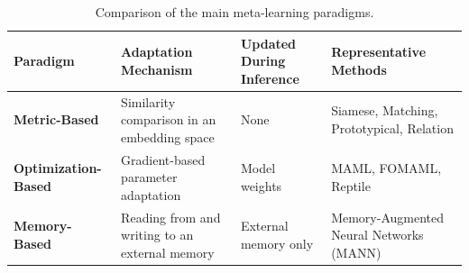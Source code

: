 \begin{table}[H]
\centering
\caption{Comparison of the main meta-learning paradigms.}
\label{tab:meta_learning_comparison}
\renewcommand{\arraystretch}{1.3}

\renewcommand{\arraystretch}{1.35}

\begin{tabularx}{\textwidth}{
>{\bfseries}p{2.8cm}
X
p{2.9cm}
X}
\toprule

Paradigm &
Adaptation Mechanism &
Updated During Inference &
Representative Methods \\

\midrule

Metric-Based &
Similarity comparison in an embedding space &
None &
Siamese, Matching, Prototypical, Relation \\

Optimization-Based &
Gradient-based parameter adaptation &
Model weights &
MAML, FOMAML, Reptile \\

Memory-Based &
Reading from and writing to an external memory &
External memory only &
Memory-Augmented Neural Networks (MANN) \\

\bottomrule
\end{tabularx}

\end{table}

